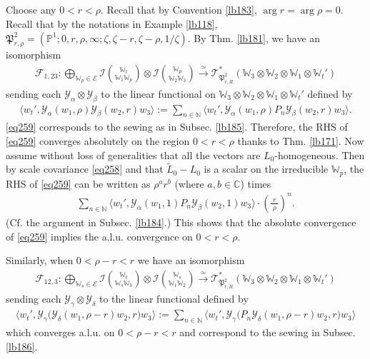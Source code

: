 \documentclass[12pt,a4paper,notitlepage]{article}
\theoremstyle{definition}
\theoremstyle{plain}
\newcommand{\fk}{\mathfrak}
\newcommand{\mc}{\mathcal}
\newcommand{\wtd}{\widetilde}
\newcommand{\bigbk}[1]{\big\langle {#1}\big\rangle}
\newcommand{\scr}{\mathscr}
\newcommand{\Wbb}{\mathbb W}
\newcommand{\Cbb}{\mathbb C}
\newcommand{\Nbb}{\mathbb N}
\newcommand{\Pbb}{\mathbb P}
\numberwithin{equation}{section}
\begin{document}
\subsection{}


Choose any $0<r<\rho$. Recall that by Convention \ref{lb183}, $\arg r=\arg\rho=0$. Recall that by the notations in Example \ref{lb118}, $\fk P^2_{r,\rho}=(\Pbb^1;0,r,\rho,\infty;\zeta,\zeta-r,\zeta-\rho,1/\zeta)$. By Thm. \ref{lb181}, we have an isomorphism
\begin{gather*}
\mc F_{1,23}:\bigoplus_{\Wbb_p\in\mc E}\mc I{\Wbb_t\choose \Wbb_1\Wbb_p}\otimes \mc I{\Wbb_p\choose\Wbb_2\Wbb_3}\xrightarrow{\simeq}\scr T_{\fk P^2_{r,R}}^*(\Wbb_3\otimes\Wbb_2\otimes\Wbb_1\otimes\Wbb_t')
\end{gather*}
sending each $\mc Y_\alpha\otimes\mc Y_\beta$ to the linear functional on $\Wbb_3\otimes\Wbb_2\otimes\Wbb_1\otimes\Wbb_t'$ defined by
\begin{align}\label{eq259}
\bigbk{w_t',\mc Y_\alpha(w_1,\rho)\mc Y_\beta(w_2,r)w_3}:=\sum_{n\in\Nbb}\bigbk{w_t',\mc Y_\alpha(w_1,\rho)P_n\mc Y_\beta(w_2,r)w_3}.
\end{align}
\eqref{eq259} corresponds to the sewing as in Subsec. \ref{lb185}. Therefore, the RHS of \eqref{eq259} converges absolutely on the region $0<r<\rho$ thanks to Thm. \ref{lb171}. Now assume without loss of generalities that all the vectors are $L_0$-homogeneous. Then by scale covariance \eqref{eq258} and that $\wtd L_0-L_0$ is a scalar on the irreducible $\Wbb_p$, the RHS of \eqref{eq259} can be written as $\rho^ar^b$ (where $a,b\in\Cbb$) times
\begin{align*}
\sum_{n\in\Nbb}\bigbk{w_t',\mc Y_\alpha(w_1,1)P_n\mc Y_\beta(w_2,1)w_3}\cdot \left(\frac {~r~}{~\rho~}\right)^n.
\end{align*}
(Cf. the argument in Subsec. \ref{lb184}.) This shows that the absolute convergence of \eqref{eq259} implies the a.l.u. convergence on $0<r<\rho$.



Similarly, when $0<\rho-r<r$ we have an isomorphism
\begin{align*}
\mc F_{12,3}:\bigoplus_{\Wbb_s\in\mc E}\mc I{\Wbb_t\choose \Wbb_s\Wbb_3}\otimes\mc I{\Wbb_s\choose \Wbb_1\Wbb_2}\xrightarrow{\simeq}\scr T_{\fk P^2_{r,R}}^*(\Wbb_3\otimes\Wbb_2\otimes\Wbb_1\otimes\Wbb_t')
\end{align*}
sending each $\mc Y_\gamma\otimes\mc Y_\delta$ to the linear functional defined by
\begin{align}
\bigbk{w_t',\mc Y_\gamma\big(\mc Y_\delta(w_1,\rho-r)w_2,r\big)w_3}:=\sum_{n\in\Nbb}\bigbk{w_t',\mc Y_\gamma\big(P_n\mc Y_\delta(w_1,\rho-r)w_2,r\big)w_3}\label{eq261}
\end{align}
which converges a.l.u. on $0<\rho-r<r$ and correspond to the sewing in Subsec. \ref{lb186}.
\end{document}
